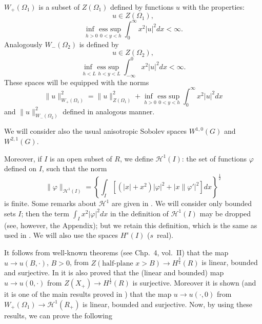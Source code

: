 \documentclass[a4paper,12pt,leqno]{article}
\numberwithin{equation}{section}
\begin{document}
$W_{+}\left(\Omega_{1}\right)$ is a subset of $Z\left(\Omega_{1}\right)$ defined by functions $u$ with the properties:
\begin{equation}
	u \in Z\left(\Omega_{1}\right),
\end{equation}
\begin{equation}
	\underset{h > 0 ~~ 0<y<h}{\operatorname{inf~~ess~sup}} \int_{0}^{\infty} x^{2}|u|^{2} d x<\infty.
\end{equation}
Analogously $W_{-}\left(\Omega_{2}\right)$ is defined by
\begin{equation}
	u \in Z\left(\Omega_{2}\right),
\end{equation}
\begin{equation}
	\underset{h < L~~ h<y<L}{\operatorname{inf~~ess~sup}} \int_{-\infty}^{0} x^{2	}|u|^{2} d x<\infty.
\end{equation}
These spaces will be equipped with the norms
\begin{equation}
	\|u\|_{W_{+}(\Omega_1)}^{2}
	= \|u\|_{Z(\Omega_1)}^2 + \underset{h > 0 ~~ 0<y<h}{\operatorname{inf~~ess~sup}} \int_{0}^{\infty} x^{2}|u|^{2} d x
\end{equation}
and $\|u\|_{W_{-}(\Omega_2)}^{2}$ defined in analogous manner.

We will consider also the usual anisotropic Sobolev spaces $W^{1,0}(G)$ and $W^{2,1}(G)$.

Moreover, if $I$ is an open subset of $R$, we define $\mathscr{H}^1(I)$: the set of functions $\varphi$ defined on $I$, such that the norm
\begin{equation}
	\|\varphi\|_{\mathscr{H}^1(I)} =\left\{ \int_{I}\left[\left(|x|+x^{2}\right)|\varphi|^{2}+\left|x \| \varphi'\right|^{2}\right] d x 
	\right\}^{\frac{1}{2}}
\end{equation}
is finite. Some remarks about $\mathscr{H}^1$ are given in \cite{zbMATH03479447}. 
We will consider only bounded sets $I$; then the term $\int_I x^{2}|\varphi|^{2} d x$ in the definition of $\mathscr{H}^1(I)$ may be dropped (see, however, the Appendix); but we retain this definition, which is the same as used in  \cite{zbMATH03479447}. We will also use the spaces $H^s(I)$ ($s$~real).

\newpage

It follows from well-known theorems (see \cite{zbMATH03353865} Chp.\ 4, vol.\ II) that the map $u \to u(B,\cdot)$, $B > 0$, from $Z(\text{half-plane~} x > B) \to H^{\frac 3 4}(R)$ is linear, bounded and surjective. 
In \cite{zbMATH03479447} it is also proved that the (linear and bounded) map $u \rightarrow u(0, \cdot)$ from $Z\left(X_{+}\right) \to H^{\frac 1 2}(R)$ is surjective. 
Moreover it is shown (and it is one of the main results proved in \cite{zbMATH03479447}) that the map $u \rightarrow u(\cdot, 0)$ from $W_{+}\left(\Omega_{1}\right) \rightarrow \mathscr{H}^1(R_+)$ is linear, bounded and surjective. 
Now, by using these results, we can prove the following
\end{document}
